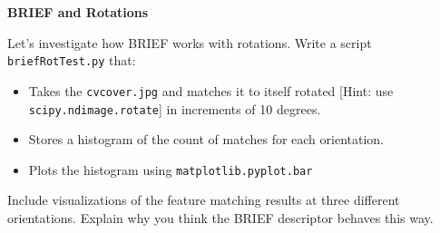 \newpage
\begin{problem}
  \textbf{BRIEF and Rotations}

  Let’s investigate how BRIEF works with rotations.
  Write a script \verb|briefRotTest.py| that:
  \begin{itemize}
    \item Takes the \verb|cvcover.jpg| and matches it to itself rotated
      [Hint: use \verb|scipy.ndimage.rotate|] in increments of 10 degrees.
    \item Stores a histogram of the count of matches for each orientation.
    \item Plots the histogram using \verb|matplotlib.pyplot.bar|
  \end{itemize}
  Include visualizations of the feature matching results at three
  different orientations. Explain why you think the BRIEF descriptor
  behaves this way.


\end{problem}
